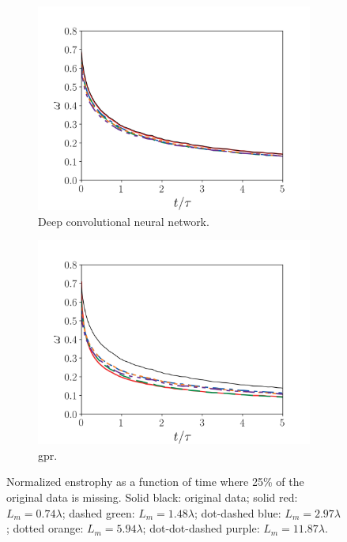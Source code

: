 \documentclass[review]{elsarticle}
\begin{document}
\begin{figure}[!tbp]%
  \centering%
  \begin{subfigure}[t]{0.48\textwidth}%
    \includegraphics[width=\textwidth]{./figs/enstrophy_result.png}%
    \caption{Deep convolutional neural network.}\label{fig:enstrophy_dl}%
  \end{subfigure}%
  \hfill%
  \begin{subfigure}[t]{0.48\textwidth}%
    \includegraphics[width=\textwidth]{./figs/enstrophy_interp.png}%
    \caption{\gls{gpr}.}\label{fig:enstrophy_gp}%
  \end{subfigure}%
  \caption{Normalized enstrophy as a function of time where 25\% of
    the original data is missing. Solid black: original data; solid
    red: $L_m=0.74\lambda$; dashed green: $L_m=1.48\lambda$;
    dot-dashed blue: $L_m=2.97\lambda$; dotted orange:
    $L_m=5.94\lambda$; dot-dot-dashed purple:
    $L_m=11.87\lambda$.}\label{fig:hit_enstrophy}%
\end{figure}%
\end{document}
